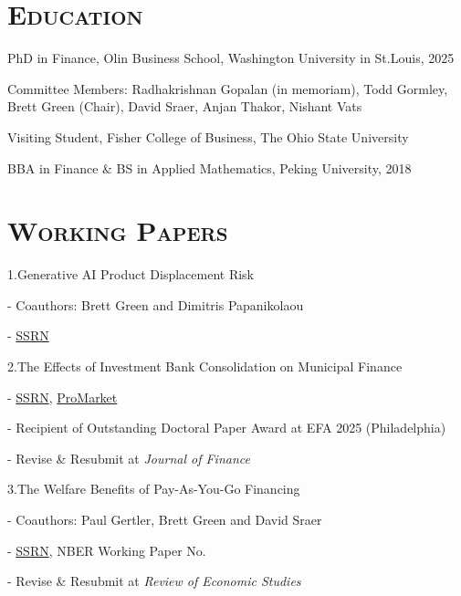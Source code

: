 \documentclass[11pt]{article}
\renewenvironment{itemize}{
  \begin{list}{}{
    \setlength{\leftmargin}{1.5em}
  }
}{
  \end{list}
}
\newcommand{\GreenLiPapanikolaou}{1}
\newcommand{\LiUnderwriterMarketPower}{2}
\newcommand{\GertlerGreenLiSraer}{3}
\begin{document}
\section*{\textsc{Education}}

\begin{itemize}

\item PhD in Finance, Olin Business School, Washington University in St.\;Louis, 2025
\begin{itemize}
\item Committee Members: Radhakrishnan Gopalan (in memoriam), Todd Gormley, Brett Green (Chair), David Sraer, Anjan Thakor, Nishant Vats
\end{itemize}
\item Visiting Student, Fisher College of Business, The Ohio State University
\item BBA in Finance \& BS in Applied Mathematics, Peking University, 2018

\end{itemize}




\section*{\textsc{Working Papers}}
\begin{itemize}
\item \GreenLiPapanikolaou.\;Generative AI Product Displacement Risk
\begin{itemize}
\item - Coauthors: Brett Green and Dimitris Papanikolaou
\item - \href{https://papers.ssrn.com/sol3/papers.cfm?abstract_id=6368558}{SSRN}
\end{itemize}
\item \LiUnderwriterMarketPower.\;The Effects of Investment Bank Consolidation on Municipal Finance
\begin{itemize}
\item - \href{https://papers.ssrn.com/sol3/papers.cfm?abstract_id=4687748}{SSRN}, \href{https://www.promarket.org/2024/05/20/banking-consolidation-raises-the-costs-for-local-governments-to-issue-new-debt/}{ProMarket}
\item - Recipient of Outstanding Doctoral Paper Award at EFA 2025 (Philadelphia)
\item - Revise \& Resubmit at \emph{\sbweight Journal of Finance}
\end{itemize}
\item \GertlerGreenLiSraer.\;The Welfare Benefits of Pay-As-You-Go Financing
\begin{itemize}
\item - Coauthors: Paul Gertler, Brett Green and David Sraer
\item - \href{https://papers.ssrn.com/sol3/papers.cfm?abstract_id=4641559}{SSRN}, NBER Working Paper No.
\item - Revise \& Resubmit at \emph{\sbweight Review of Economic Studies}
\end{itemize}
\end{itemize}
\end{document}

